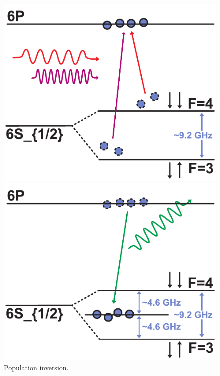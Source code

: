 \begin{figure}[H]
    \centering

    \begin{minipage}[t]{0.3\linewidth}
        \centering
        \includegraphics[width=\linewidth]{pdf/CPT/pumping.pdf}
        \caption{Population inversion.}
        \label{fig:CPT-pumping}
    \end{minipage}
    \hfill
    \begin{minipage}[t]{0.3\linewidth}
        \centering
        \includegraphics[width=\linewidth]{pdf/CPT/decay.pdf}

\end{minipage}
\end{figure}
